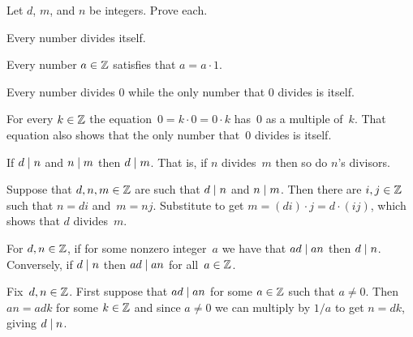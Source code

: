 \documentclass{ibl}  %
\begin{document}
\begin{problem}  
\label{ex:DivisibilityProperties}
Let $d$, $m$, and $n$ be integers.
Prove each.
\begin{exes}
\begin{exercise}
   Every number divides itself.
\end{exercise}
\begin{answer}
  Every number $a\in\mathbb{Z}$ satisfies that $a=a\cdot 1$.
\end{answer}
\begin{exercise}
  Every number divides $0$ while
  the only number that $0$ divides is itself.
\end{exercise}
\begin{answer}
  For every $k\in\mathbb{Z}$ the equation~$0=k\cdot 0=0\cdot k$ has~$0$ 
  as a multiple of~$k$.
  That equation also shows that the only number that~$0$ divides is itself. 
\end{answer}
\begin{exercise}
   If $d\mid n$ and $n\mid m$ 
   then $d\mid m$.
   That is, if $n$ divides~$m$ then so do $n$'s divisors.
\end{exercise}
\begin{answer}
  Suppose that $d, n, m\in\mathbb{Z}$ are such that $d\mid n$ and
  $n\mid m$.
  Then there are $i,j\in\mathbb{Z}$ such that $n=di$ and~$m=nj$.
  Substitute to get $m=(di)\cdot j=d\cdot(ij)$, which shows that
  $d$ divides~$m$.
\end{answer}
\begin{exercise}
  For $d,n\in\mathbb{Z}$, if for some nonzero integer~$a$ we have that $ad\mid an$ 
  then $d\mid n$.
  Conversely, if $d\mid n$ then $ad\mid an$ for all~$a\in\mathbb{Z}$.
\end{exercise}
\begin{answer}
  Fix~$d,n\in\mathbb{Z}$.
  First suppose that $ad\mid an$ for some $a\in\mathbb{Z}$ such that $a\neq 0$. 
  Then $an=adk$ for some $k\in\mathbb{Z}$ and
  since $a\neq 0$ we can multiply by $1/a$ to get $n=dk$, giving 
  $d\mid n$.


\end{answer}
\end{exes}
\end{problem}
\end{document}
